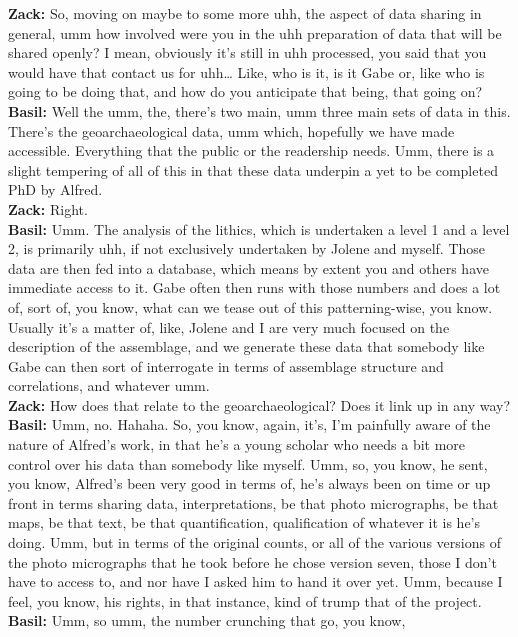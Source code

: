 \documentclass[
  canadian,
]{article}
\begin{document}
\textbf{Zack:} So, moving on maybe to some more uhh, the aspect of data
sharing in general, umm how involved were you in the uhh preparation of
data that will be shared openly? I mean, obviously it's still in uhh
processed, you said that you would have that contact us for uhh\ldots{}
Like, who is it, is it Gabe or, like who is going to be doing that, and
how do you anticipate that being, that going on?\\
\textbf{Basil:} Well the umm, the, there's two main, umm three main sets
of data in this. There's the geoarchaeological data, umm which,
hopefully we have made accessible. Everything that the public or the
readership needs. Umm, there is a slight tempering of all of this in
that these data underpin a yet to be completed PhD by Alfred.\\
\textbf{Zack:} Right.\\
\textbf{Basil:} Umm. The analysis of the lithics, which is undertaken a
level 1 and a level 2, is primarily uhh, if not exclusively undertaken
by Jolene and myself. Those data are then fed into a database, which
means by extent you and others have immediate access to it. Gabe often
then runs with those numbers and does a lot of, sort of, you know, what
can we tease out of this patterning-wise, you know. Usually it's a
matter of, like, Jolene and I are very much focused on the description
of the assemblage, and we generate these data that somebody like Gabe
can then sort of interrogate in terms of assemblage structure and
correlations, and whatever umm.\\
\textbf{Zack:} How does that relate to the geoarchaeological? Does it
link up in any way?\\
\textbf{Basil:} Umm, no. Hahaha. So, you know, again, it's, I'm
painfully aware of the nature of Alfred's work, in that he's a young
scholar who needs a bit more control over his data than somebody like
myself. Umm, so, you know, he sent, you know, Alfred's been very good in
terms of, he's always been on time or up front in terms sharing data,
interpretations, be that photo micrographs, be that maps, be that text,
be that quantification, qualification of whatever it is he's doing. Umm,
but in terms of the original counts, or all of the various versions of
the photo micrographs that he took before he chose version seven, those
I don't have to access to, and nor have I asked him to hand it over yet.
Umm, because I feel, you know, his rights, in that instance, kind of
trump that of the project.\\
\textbf{Basil:} Umm, so umm, the number crunching that go, you know,
\end{document}
